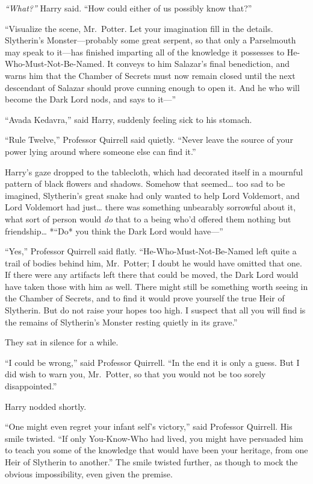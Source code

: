 \emph{``What?''} Harry said. ``How could either of us possibly know
that?''

``Visualize the scene, Mr.~Potter. Let your imagination fill in the
details. Slytherin's Monster---probably some great serpent, so that only
a Parselmouth may speak to it---has finished imparting all of the
knowledge it possesses to He-Who-Must-Not-Be-Named. It conveys to him
Salazar's final benediction, and warns him that the Chamber of Secrets
must now remain closed until the next descendant of Salazar should prove
cunning enough to open it. And he who will become the Dark Lord nods,
and says to it---''

``Avada Kedavra,'' said Harry, suddenly feeling sick to his stomach.

``Rule Twelve,'' Professor Quirrell said quietly. ``Never leave the
source of your power lying around where someone else can find it.''

Harry's gaze dropped to the tablecloth, which had decorated itself in a
mournful pattern of black flowers and shadows. Somehow that
seemed\ldots{} too sad to be imagined, Slytherin's great snake had only
wanted to help Lord Voldemort, and Lord Voldemort had just\ldots{} there
was something unbearably sorrowful about it, what sort of person would
\emph{do} that to a being who'd offered them nothing but
friendship\ldots{} *``Do* you think the Dark Lord would have---''

``Yes,'' Professor Quirrell said flatly. ``He-Who-Must-Not-Be-Named left
quite a trail of bodies behind him, Mr.~Potter; I doubt he would have
omitted that one. If there were any artifacts left there that could be
moved, the Dark Lord would have taken those with him as well. There
might still be something worth seeing in the Chamber of Secrets, and to
find it would prove yourself the true Heir of Slytherin. But do not
raise your hopes too high. I suspect that all you will find is the
remains of Slytherin's Monster resting quietly in its grave.''

They sat in silence for a while.

``I could be wrong,'' said Professor Quirrell. ``In the end it is only a
guess. But I did wish to warn you, Mr.~Potter, so that you would not be
too sorely disappointed.''

Harry nodded shortly.

``One might even regret your infant self's victory,'' said Professor
Quirrell. His smile twisted. ``If only You-Know-Who had lived, you might
have persuaded him to teach you some of the knowledge that would have
been your heritage, from one Heir of Slytherin to another.'' The smile
twisted further, as though to mock the obvious impossibility, even given
the premise.

